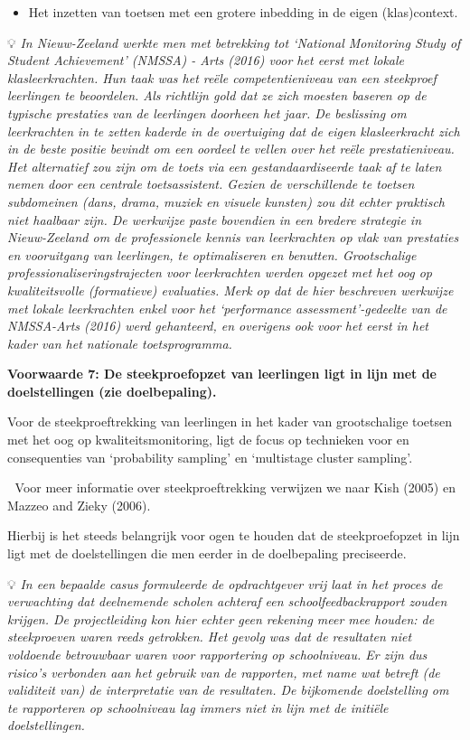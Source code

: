\documentclass[
  letterpaper,
]{report}
\providecommand{\tightlist}{%
  \setlength{\itemsep}{0pt}\setlength{\parskip}{0pt}}
\begin{document}
\begin{itemize}
\tightlist
\item
  Het inzetten van toetsen met een grotere inbedding in de eigen
  (klas)context.
\end{itemize}

💡 \emph{In Nieuw-Zeeland werkte men met betrekking tot `National
Monitoring Study of Student Achievement' (NMSSA) - Arts (2016) voor het
eerst met lokale klasleerkrachten. Hun taak was het reële
competentieniveau van een steekproef leerlingen te beoordelen. Als
richtlijn gold dat ze zich moesten baseren op de typische prestaties van
de leerlingen doorheen het jaar. De beslissing om leerkrachten in te
zetten kaderde in de overtuiging dat de eigen klasleerkracht zich in de
beste positie bevindt om een oordeel te vellen over het reële
prestatieniveau. Het alternatief zou zijn om de toets via een
gestandaardiseerde taak af te laten nemen door een centrale
toetsassistent. Gezien de verschillende te toetsen subdomeinen (dans,
drama, muziek en visuele kunsten) zou dit echter praktisch niet haalbaar
zijn. De werkwijze paste bovendien in een bredere strategie in
Nieuw-Zeeland om de professionele kennis van leerkrachten op vlak van
prestaties en vooruitgang van leerlingen, te optimaliseren en benutten.
Grootschalige professionaliseringstrajecten voor leerkrachten werden
opgezet met het oog op kwaliteitsvolle (formatieve) evaluaties. Merk op
dat de hier beschreven werkwijze met lokale leerkrachten enkel voor het
`performance assessment'-gedeelte van de NMSSA-Arts (2016) werd
gehanteerd, en overigens ook voor het eerst in het kader van het
nationale toetsprogramma.}

\textbf{Voorwaarde 7: De steekproefopzet van leerlingen ligt in lijn met
de doelstellingen (zie doelbepaling).}

Voor de steekproeftrekking van leerlingen in het kader van grootschalige
toetsen met het oog op kwaliteitsmonitoring, ligt de focus op technieken
voor en consequenties van `probability sampling' en `multistage cluster
sampling'.

📖 Voor meer informatie over steekproeftrekking verwijzen we naar Kish
(2005) en Mazzeo and Zieky (2006).

Hierbij is het steeds belangrijk voor ogen te houden dat de
steekproefopzet in lijn ligt met de doelstellingen die men eerder in de
doelbepaling preciseerde.

💡 \emph{In een bepaalde casus formuleerde de opdrachtgever vrij laat in
het proces de verwachting dat deelnemende scholen achteraf een
schoolfeedbackrapport zouden krijgen. De projectleiding kon hier echter
geen rekening meer mee houden: de steekproeven waren reeds getrokken.
Het gevolg was dat de resultaten niet voldoende betrouwbaar waren voor
rapportering op schoolniveau. Er zijn dus risico's verbonden aan het
gebruik van de rapporten, met name wat betreft (de validiteit van) de
interpretatie van de resultaten. De bijkomende doelstelling om te
rapporteren op schoolniveau lag immers niet in lijn met de initiële
doelstellingen.}
\end{document}
